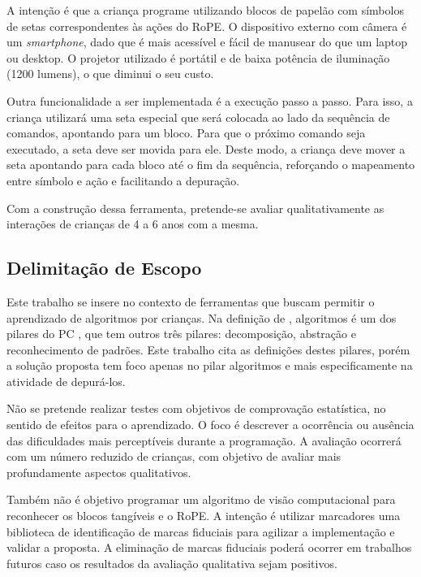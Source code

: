 A intenção é que a criança programe utilizando blocos de papelão com símbolos de setas correspondentes às ações do RoPE. O dispositivo externo com câmera é um \textit{smartphone}, dado que é mais acessível e fácil de manusear do que um laptop ou desktop. O projetor utilizado é portátil e de baixa potência de iluminação (1200 lumens), o que diminui o seu custo.

Outra funcionalidade a ser implementada é a execução passo a passo. Para isso, a criança utilizará uma seta especial que será colocada ao lado da sequência de comandos, apontando para um bloco. Para que o próximo comando seja executado, a seta deve ser movida para ele. Deste modo, a criança deve mover a seta apontando para cada bloco até o fim da sequência, reforçando o mapeamento entre símbolo e ação e facilitando a depuração.

Com a construção dessa ferramenta, pretende-se avaliar qualitativamente as interações de crianças de 4 a 6 anos com a mesma. 

\subsection{Delimitação de Escopo}
\label{ss_cintro_escopo}

Este trabalho se insere no contexto de ferramentas que buscam permitir o aprendizado de algoritmos por crianças. Na definição de , algoritmos é um dos pilares do \acl{PC} \cite{brackmann_desenvolvimento_2017}, que tem outros três pilares: decomposição, abstração e reconhecimento de padrões. Este trabalho cita as definições destes pilares, porém a solução proposta tem foco apenas no pilar algoritmos e mais especificamente na atividade de depurá-los.

Não se pretende realizar testes com objetivos de comprovação estatística, no sentido de efeitos para o aprendizado. O foco é descrever a ocorrência ou ausência das dificuldades mais perceptíveis durante a programação. A avaliação ocorrerá com um número reduzido de crianças, com objetivo de avaliar mais profundamente aspectos qualitativos.

Também não é objetivo programar um algoritmo de visão computacional para reconhecer os blocos tangíveis e o RoPE. A intenção é utilizar marcadores uma biblioteca de identificação de marcas fiduciais para agilizar a implementação e validar a proposta. A eliminação de marcas fiduciais poderá ocorrer em trabalhos futuros caso os resultados da avaliação qualitativa sejam positivos.

